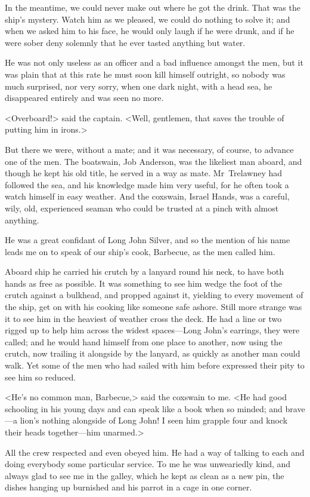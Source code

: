 In the meantime, we could never make out where he got the drink. That was the ship's mystery. Watch him as we pleased, we could do nothing to solve it; and when we asked him to his face, he would only laugh if he were drunk, and if he were sober deny solemnly that he ever tasted anything but water.

He was not only useless as an officer and a bad influence amongst the men, but it was plain that at this rate he must soon kill himself outright, so nobody was much surprised, nor very sorry, when one dark night, with a head sea, he disappeared entirely and was seen no more.

<Overboard!> said the captain. <Well, gentlemen, that saves the trouble of putting him in irons.>

But there we were, without a mate; and it was necessary, of course, to advance one of the men. The boatswain, Job Anderson, was the likeliest man aboard, and though he kept his old title, he served in a way as mate. Mr~Trelawney had followed the sea, and his knowledge made him very useful, for he often took a watch himself in easy weather. And the coxswain, Israel Hands, was a careful, wily, old, experienced seaman who could be trusted at a pinch with almost anything.

He was a great confidant of Long John Silver, and so the mention of his name leads me on to speak of our ship's cook, Barbecue, as the men called him.

Aboard ship he carried his crutch by a lanyard round his neck, to have both hands as free as possible. It was something to see him wedge the foot of the crutch against a bulkhead, and propped against it, yielding to every movement of the ship, get on with his cooking like someone safe ashore. Still more strange was it to see him in the heaviest of weather cross the deck. He had a line or two rigged up to help him across the widest spaces—Long John's earrings, they were called; and he would hand himself from one place to another, now using the crutch, now trailing it alongside by the lanyard, as quickly as another man could walk. Yet some of the men who had sailed with him before expressed their pity to see him so reduced.

<He's no common man, Barbecue,> said the coxswain to me. <He had good schooling in his young days and can speak like a book when so minded; and brave—a lion's nothing alongside of Long John! I seen him grapple four and knock their heads together—him unarmed.>

All the crew respected and even obeyed him. He had a way of talking to each and doing everybody some particular service. To me he was unweariedly kind, and always glad to see me in the galley, which he kept as clean as a new pin, the dishes hanging up burnished and his parrot in a cage in one corner.

